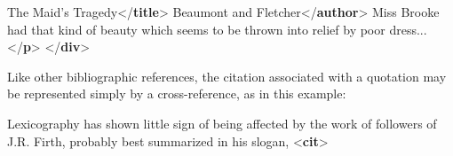 \begin{shaded}
\hspace*{1em}\hspace*{1em}\mbox{}\newline 
\hspace*{1em}\hspace*{1em}\hspace*{1em}The Maid's Tragedy{</\textbf{title}>}\mbox{}\newline 
\hspace*{1em}\hspace*{1em}\hspace*{1em}Beaumont and Fletcher{</\textbf{author}>}\mbox{}\newline 
\hspace*{1em}\hspace*{1em}\mbox{}\newline 
\hspace*{1em}\mbox{}\newline 
{}\mbox{}\newline 
{}Miss Brooke had that kind of beauty which seems to be thrown into\mbox{}\newline 
\hspace*{1em}\hspace*{1em} relief by poor dress...{</\textbf{p}>}\mbox{}\newline 
{</\textbf{div}>}\end{shaded}\egroup\par \noindent  Like other bibliographic references, the citation associated with a quotation may be represented simply by a cross-reference, as in this example: \par\bgroup{}\exampleFont \begin{shaded}\noindent\mbox{}Lexicography has shown little sign of being affected by the\mbox{}\newline 
 work of followers of J.R. Firth, probably best summarized\mbox{}\newline 
 in his slogan, {<\textbf{cit}>}\mbox{}\newline 

\end{shaded}
